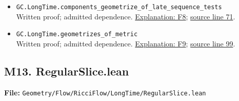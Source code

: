 \documentclass[
  letterpaper,
  11pt]{article}
\begin{document}
\begin{itemize}
{  line 62}.
\item
  {\small\texttt{GC.\allowbreak{}Long\allowbreak{}Time.\allowbreak{}components\_\allowbreak{}geometrize\_\allowbreak{}of\_\allowbreak{}late\_\allowbreak{}sequence\_\allowbreak{}tests}}\\
  Written proof; admitted dependence.
  \hyperref[f8-bad-sequence-proof]{Explanation: F8};
  \href{https://github.com/qinz1yang/differential-geometry-dev/blob/ea0fae60ee01ef8c8d9b57a51794c6538f679c5d/DifferentialGeometry/Geometry/Flow/RicciFlow/LongTime/LateDecomposition.lean\#L71}{source
  line 71}.
\item
  {\small\texttt{GC.\allowbreak{}Long\allowbreak{}Time.\allowbreak{}geometrizes\_\allowbreak{}of\_\allowbreak{}metric}}\\
  Written proof; admitted dependence.
  \hyperref[f9-capstone]{Explanation: F9};
  \href{https://github.com/qinz1yang/differential-geometry-dev/blob/ea0fae60ee01ef8c8d9b57a51794c6538f679c5d/DifferentialGeometry/Geometry/Flow/RicciFlow/LongTime/LateDecomposition.lean\#L99}{source
  line 99}.
\end{itemize}


\subsection{M13. RegularSlice.lean}\label{m13.-regularslice.lean}

\textbf{File:}
{\small\texttt{Geometry/\allowbreak{}Flow/\allowbreak{}Ricci\allowbreak{}Flow/\allowbreak{}Long\allowbreak{}Time/\allowbreak{}Regular\allowbreak{}Slice.\allowbreak{}lean}}
\end{document}
